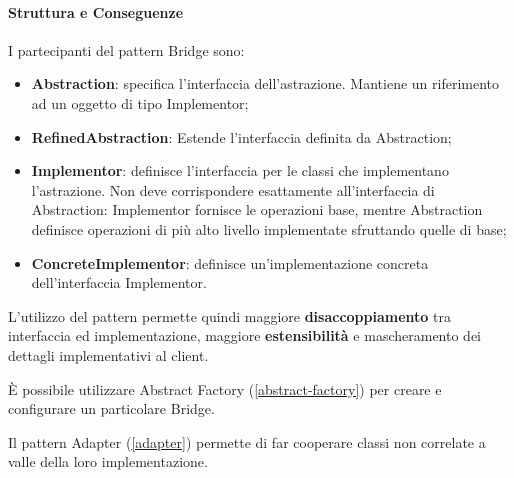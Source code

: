 \paragraph{Struttura e Conseguenze} I partecipanti del pattern Bridge sono:
\begin{itemize}
    \item \textbf{Abstraction}: specifica l’interfaccia dell’astrazione. Mantiene un riferimento ad un oggetto di tipo Implementor;
    \item \textbf{RefinedAbstraction}: Estende l’interfaccia definita da Abstraction;
    \item \textbf{Implementor}: definisce l’interfaccia per le classi che implementano l’astrazione. Non deve corrispondere esattamente all’interfaccia di Abstraction: Implementor fornisce le operazioni base, mentre Abstraction definisce operazioni di più alto livello implementate sfruttando quelle di base;
    \item \textbf{ConcreteImplementor}: definisce un’implementazione concreta dell’interfaccia Implementor.
\end{itemize}

L'utilizzo del pattern permette quindi maggiore \textbf{disaccoppiamento} tra interfaccia ed implementazione, maggiore \textbf{estensibilità} e mascheramento dei dettagli implementativi al client.

È possibile utilizzare Abstract Factory (\ref{abstract-factory}) per creare e configurare un particolare Bridge.

Il pattern Adapter (\ref{adapter}) permette di far cooperare classi non correlate a valle della loro implementazione.

\newpage